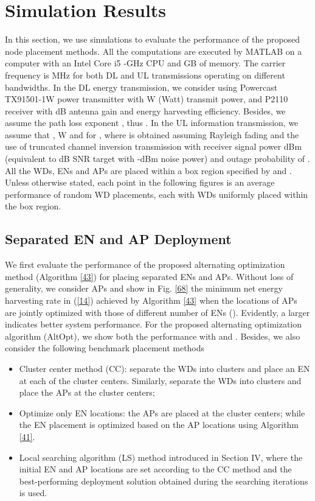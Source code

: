 \documentclass[journal, draftcls, one column, 12pt]{IEEEtran}
\begin{document}
\section{Simulation Results}
In this section, we use simulations to evaluate the performance of the proposed node placement methods. All the computations are executed by MATLAB on a computer with an Intel Core i5 -GHz CPU and  GB of memory. The carrier frequency is  MHz for both DL and UL transmissions operating on different bandwidths. In the DL energy transmission, we consider using Powercast TX91501-1W power transmitter with W (Watt) transmit power, and P2110 receiver with  dB antenna gain and  energy harvesting efficiency. Besides, we assume the path loss exponent , thus . In the UL information transmission, we assume that , W and  for , where  is obtained assuming Rayleigh fading and the use of truncated channel inversion transmission \cite{2005:Goldsmith} with receiver signal power dBm (equivalent to dB SNR target with -dBm noise power) and outage probability of . All the WDs, ENs and APs are placed within a  box region specified by  and . Unless otherwise stated, each point in the following figures is an average performance of  random WD placements, each with  WDs uniformly placed within the box region.

\subsection{Separated EN and AP Deployment}
We first evaluate the performance of the proposed alternating optimization method (Algorithm \ref{43}) for placing separated ENs and APs. Without loss of generality, we consider  APs and show in Fig. \ref{68} the minimum net energy harvesting rate  in (\ref{14}) achieved by Algorithm \ref{43} when the locations of APs are jointly optimized with those of different number of ENs (). Evidently, a larger  indicates better system performance. For the proposed alternating optimization algorithm (AltOpt), we show both the performance with  and . Besides, we also consider the following benchmark placement methods
\begin{itemize}
  \item Cluster center method (CC): separate the WDs into  clusters and place an EN at each of the cluster centers. Similarly, separate the WDs into  clusters and place the  APs at the cluster centers;
  \item Optimize only EN locations: the APs are placed at the  cluster centers; while the EN placement is optimized based on the AP locations using Algorithm \ref{41}.
  \item Local searching algorithm (LS) method introduced in Section IV, where the initial EN and AP locations are set according to the CC method and the best-performing deployment solution obtained during the searching iterations is used.
\end{itemize}
\end{document}
